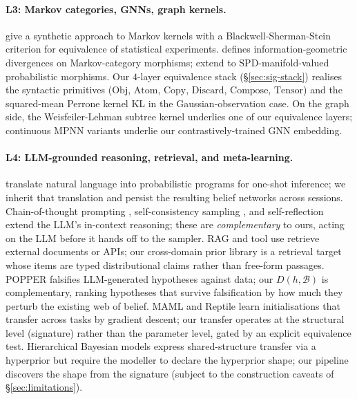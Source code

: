 \documentclass{article}
\begin{document}
\paragraph{L3: Markov categories, GNNs, graph kernels.}
\citet{fritz2020synthetic} give a synthetic approach to Markov
kernels with a Blackwell-Sherman-Stein
\citep{blackwell1953equivalent} criterion for equivalence of
statistical experiments. \citet{perrone2024catinfogeom} defines
information-geometric divergences on Markov-category morphisms;
\citet{le2025spdmanifold} extend to SPD-manifold-valued
probabilistic morphisms. Our $4$-layer equivalence stack
(\S\ref{sec:sig-stack}) realises the syntactic primitives
($\mathrm{Obj}$, $\mathrm{Atom}$, $\mathrm{Copy}$, $\mathrm{Discard}$,
$\mathrm{Compose}$, $\mathrm{Tensor}$) and the squared-mean Perrone
kernel KL in the Gaussian-observation case.
On the graph side, the Weisfeiler-Lehman subtree kernel
\citep{shervashidze2011wl} underlies one of our equivalence layers;
continuous MPNN variants \citep{scarselli2008gnn, kipf2017gcn,
xu2019gin, gilmer2017mpnn} underlie our contrastively-trained
GNN embedding.

\paragraph{L4: LLM-grounded reasoning, retrieval, and meta-learning.}
\citet{wong2023wordmodels} translate natural language into
probabilistic programs for one-shot inference; we inherit that
translation and persist the resulting belief networks across
sessions. Chain-of-thought prompting \citep{wei2022chain},
self-consistency sampling \citep{wang2023selfcons}, and
self-reflection \citep{madaan2023selfrefine, shinn2023reflexion}
extend the LLM's in-context reasoning; these are \emph{complementary}
to ours, acting on the LLM before it hands off to the sampler. RAG
\citep{lewis2020rag, borgeaud2022retro} and tool use
\citep{yao2023react, schick2024toolformer} retrieve external
documents or APIs; our cross-domain prior library is a
retrieval target whose items are typed distributional claims
rather than free-form passages. POPPER \citep{huang2025popperllm}
falsifies LLM-generated hypotheses against data; our
$D(h, \mathcal{B})$ is complementary, ranking hypotheses that
survive falsification by how much they perturb the existing web of
belief. MAML \citep{finn2017maml} and Reptile \citep{nichol2018reptile}
learn initialisations that transfer across tasks by gradient
descent; our transfer operates at the structural level (signature)
rather than the parameter level, gated by an explicit equivalence
test. Hierarchical Bayesian models \citep{gelman2013bda} express
shared-structure transfer via a hyperprior but require the
modeller to declare the hyperprior shape; our pipeline discovers
the shape from the signature (subject to the construction caveats
of \S\ref{sec:limitations}).
\end{document}
